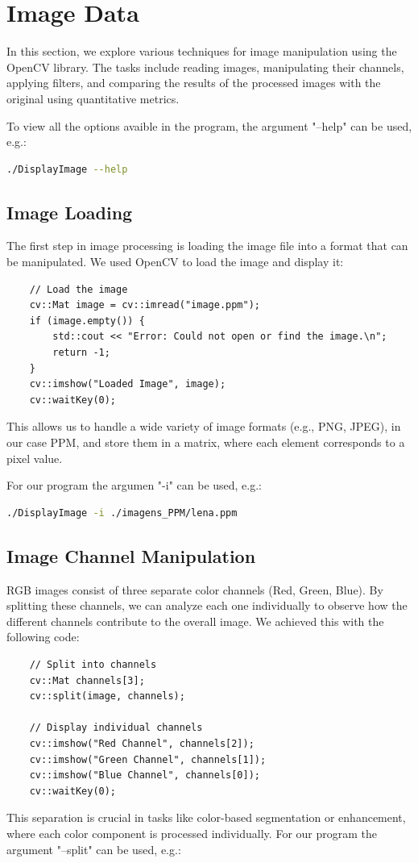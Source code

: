 \documentclass[a4paper,12pt]{article}
\begin{document}
\section{Image Data}

In this section, we explore various techniques for image manipulation using the OpenCV library. The tasks include reading images, manipulating their channels, applying filters, and comparing the results of the processed images with the original using quantitative metrics.

To view all the options avaible in the program, the argument "--help" can be used, e.g.:

\lstset{basicstyle=\small\ttfamily}
\begin{lstlisting}[language=bash]
./DisplayImage --help
\end{lstlisting}

\subsection{Image Loading}
The first step in image processing is loading the image file into a format that can be manipulated. We used OpenCV to load the image and display it:
\begin{verbatim}
    // Load the image
    cv::Mat image = cv::imread("image.ppm");
    if (image.empty()) {
        std::cout << "Error: Could not open or find the image.\n";
        return -1;
    }
    cv::imshow("Loaded Image", image);
    cv::waitKey(0);
\end{verbatim}
This allows us to handle a wide variety of image formats (e.g., PNG, JPEG), in our case PPM, and store them in a matrix, where each element corresponds to a pixel value.

For our program the argumen "-i" can be used, e.g.:

\lstset{basicstyle=\small\ttfamily}
\begin{lstlisting}[language=bash]
./DisplayImage -i ./imagens_PPM/lena.ppm
\end{lstlisting}

\subsection{Image Channel Manipulation}
RGB images consist of three separate color channels (Red, Green, Blue). By splitting these channels, we can analyze each one individually to observe how the different channels contribute to the overall image. We achieved this with the following code:
\begin{verbatim}
    // Split into channels
    cv::Mat channels[3];
    cv::split(image, channels);
    
    // Display individual channels
    cv::imshow("Red Channel", channels[2]);
    cv::imshow("Green Channel", channels[1]);
    cv::imshow("Blue Channel", channels[0]);
    cv::waitKey(0);
\end{verbatim}
This separation is crucial in tasks like color-based segmentation or enhancement, where each color component is processed individually.
For our program the argument "--split" can be used, e.g.:
\end{document}

